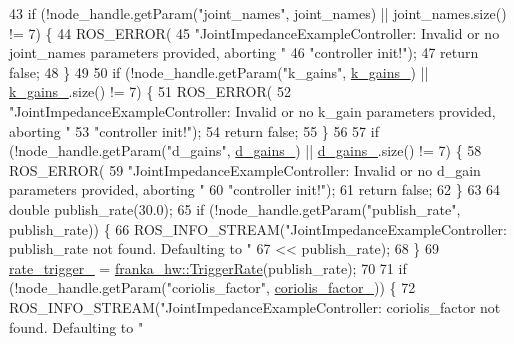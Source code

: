 \begin{DoxyCode}
43   \textcolor{keywordflow}{if} (!node\_handle.getParam(\textcolor{stringliteral}{"joint\_names"}, joint\_names) || joint\_names.size() != 7) \{
44     ROS\_ERROR(
45         \textcolor{stringliteral}{"JointImpedanceExampleController: Invalid or no joint\_names parameters provided, aborting "}
46         \textcolor{stringliteral}{"controller init!"});
47     \textcolor{keywordflow}{return} \textcolor{keyword}{false};
48   \}
49 
50   \textcolor{keywordflow}{if} (!node\_handle.getParam(\textcolor{stringliteral}{"k\_gains"}, \hyperlink{classfranka__example__controllers_1_1JointImpedanceExampleController_a489d73033258b6f34dfbe8b3fc101b51}{k\_gains\_}) || \hyperlink{classfranka__example__controllers_1_1JointImpedanceExampleController_a489d73033258b6f34dfbe8b3fc101b51}{k\_gains\_}.size() != 7) \{
51     ROS\_ERROR(
52         \textcolor{stringliteral}{"JointImpedanceExampleController:  Invalid or no k\_gain parameters provided, aborting "}
53         \textcolor{stringliteral}{"controller init!"});
54     \textcolor{keywordflow}{return} \textcolor{keyword}{false};
55   \}
56 
57   \textcolor{keywordflow}{if} (!node\_handle.getParam(\textcolor{stringliteral}{"d\_gains"}, \hyperlink{classfranka__example__controllers_1_1JointImpedanceExampleController_ab19eea8c0c0d0da745294e15211f4593}{d\_gains\_}) || \hyperlink{classfranka__example__controllers_1_1JointImpedanceExampleController_ab19eea8c0c0d0da745294e15211f4593}{d\_gains\_}.size() != 7) \{
58     ROS\_ERROR(
59         \textcolor{stringliteral}{"JointImpedanceExampleController:  Invalid or no d\_gain parameters provided, aborting "}
60         \textcolor{stringliteral}{"controller init!"});
61     \textcolor{keywordflow}{return} \textcolor{keyword}{false};
62   \}
63 
64   \textcolor{keywordtype}{double} publish\_rate(30.0);
65   \textcolor{keywordflow}{if} (!node\_handle.getParam(\textcolor{stringliteral}{"publish\_rate"}, publish\_rate)) \{
66     ROS\_INFO\_STREAM(\textcolor{stringliteral}{"JointImpedanceExampleController: publish\_rate not found. Defaulting to "}
67                     << publish\_rate);
68   \}
69   \hyperlink{classfranka__example__controllers_1_1JointImpedanceExampleController_afd6d8f3ae121ae1251c5053557f242a3}{rate\_trigger\_} = \hyperlink{classfranka__hw_1_1TriggerRate}{franka\_hw::TriggerRate}(publish\_rate);
70 
71   \textcolor{keywordflow}{if} (!node\_handle.getParam(\textcolor{stringliteral}{"coriolis\_factor"}, \hyperlink{classfranka__example__controllers_1_1JointImpedanceExampleController_ae00b8cb710e3a41bc7cc1b1060f52d9e}{coriolis\_factor\_})) \{
72     ROS\_INFO\_STREAM(\textcolor{stringliteral}{"JointImpedanceExampleController: coriolis\_factor not found. Defaulting to "}

\end{DoxyCode}
